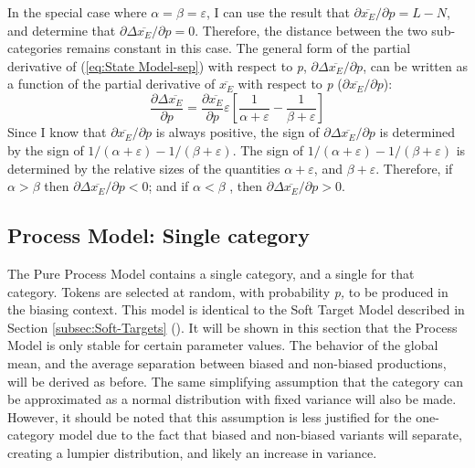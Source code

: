 In the special case where $\alpha=\beta=\varepsilon$, I can use
the result that ${\partial\overline{x_{E}}}/{\partial p}=L-N$,
and determine that ${\partial\Delta\overline{x_{E}}}/{\partial p}=0$.
Therefore, the distance between the two sub-categories remains constant
in this case. The general form of the partial derivative of (\ref{eq:State Model-sep})
with respect to \emph{p}, ${\partial\Delta\overline{x_{E}}}/{\partial p}$,
can be written as a function of the partial derivative of $\overline{x_{E}}$
with respect to \emph{p} (${\partial\overline{x_{E}}}/{\partial p}$):
\begin{equation}
\frac{\partial\Delta\overline{x_{E}}}{\partial p}=\frac{\partial\overline{x_{E}}}{\partial p}\varepsilon\left[\frac{1}{\alpha+\varepsilon}-\frac{1}{\beta+\varepsilon}\right]\label{eq: Model G: dsep/dp}
\end{equation}
Since I know that ${\partial\overline{x_{E}}}/{\partial p}$
is always positive, the sign of ${\partial\Delta\overline{x_{E}}}/{\partial p}$
is determined by the sign of ${1}/({\alpha+\varepsilon})-{1}/({\beta+\varepsilon})$.
The sign of ${1}/({\alpha+\varepsilon})-{1}/({\beta+\varepsilon})$
is determined by the relative sizes of the quantities $\alpha+\varepsilon$,
and $\beta+\varepsilon$. Therefore, if $\alpha>\beta$ then ${\partial\Delta\overline{x_{E}}}/{\partial p}<0$;
and if $\alpha<\beta$ , then ${\partial\Delta\overline{x_{E}}}/{\partial p}>0$.

\subsection{\label{subsec:Model-B:-Lengthening}Process Model: Single category}

The Pure Process Model contains a single category, and a single 
for that category. Tokens are selected at random, with probability
\emph{p,} to be produced in the biasing context. This model is identical
to the Soft Target Model described in Section \ref{subsec:Soft-Targets}
(). It will be shown in this
section that the Process Model is only stable for certain parameter
values. The behavior of the global mean, and the average separation
between biased and non-biased productions, will be derived as before.
The same simplifying assumption that the category can be approximated
as a normal distribution with fixed variance will also be made. However,
it should be noted that this assumption is less justified for the
one-category model due to the fact that biased and non-biased variants
will separate, creating a lumpier distribution, and likely an increase
in variance.

